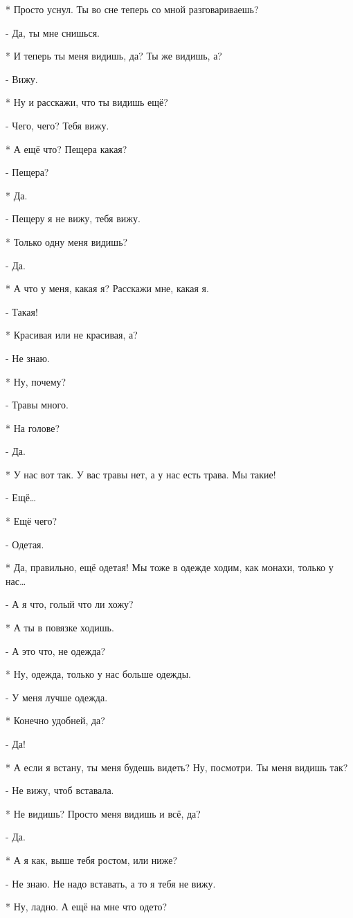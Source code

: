 * Просто уснул. Ты во сне теперь со мной разговариваешь?

- Да, ты мне снишься.

* И теперь ты меня видишь, да? Ты же видишь, а?

- Вижу.

* Ну и расскажи, что ты видишь ещё?

- Чего, чего? Тебя вижу.

* А ещё что? Пещера какая?

- Пещера?

* Да.

- Пещеру я не вижу, тебя вижу.

* Только одну меня видишь?

- Да.

* А что у меня, какая я? Расскажи мне, какая я.

- Такая!

* Красивая или не красивая, а?

- Не знаю.

* Ну, почему?

- Травы много.

*  На голове?

- Да.

* У нас вот так. У вас травы нет, а у нас есть трава. Мы такие!

- Ещё…

* Ещё чего?

- Одетая.

* Да, правильно, ещё одетая! Мы тоже в одежде ходим, как монахи, только у нас…

- А я что, голый что ли хожу?

* А ты в повязке ходишь.

- А это что, не одежда?

* Ну, одежда, только у нас больше одежды.

- У меня лучше одежда.

* Конечно удобней, да?

- Да!

*  А если я встану, ты меня будешь видеть? Ну, посмотри. Ты меня видишь так?

- Не вижу, чтоб вставала.

* Не видишь? Просто меня видишь и всё, да?

- Да.

* А я как, выше тебя ростом, или ниже?

- Не знаю. Не надо вставать, а то я тебя не вижу.

* Ну, ладно. А ещё на мне что одето?

